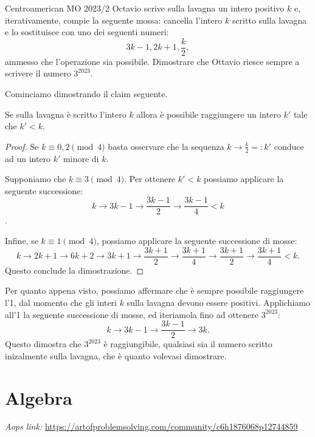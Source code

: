 \documentclass{article}
\begin{document}
\begin{proposition}{Centroamerican MO 2023/2}{}
	Octavio scrive sulla lavagna un intero positivo $k$ e, iterativamente,
	compie la seguente mossa: cancella l'intero $k$ scritto sulla lavagna
	e lo sostituisce con uno dei seguenti numeri:
	\[ 3k-1, 2k+1, \frac{k}{2}, \]
	ammesso che l'operazione sia possibile. Dimostrare che Ottavio riesce
	sempre a scrivere il numero $3^{2023}$.
\end{proposition}

Cominciamo dimostrando il claim seguente.

\begin{claim*}{}{}
	Se sulla lavagna è scritto l'intero $k$ allora è possibile
	raggiungere un intero $k'$ tale che $k'<k$.
\end{claim*}
\begin{proof}
	Se $k\equiv 0,2 \pmod{4}$ basta osservare che la sequenza
	$k\rightarrow \frac{k}{2}=:k'$ conduce ad un intero $k'$ minore di $k$.

	Supponiamo che $k\equiv 3\pmod{4}$. Per ottenere $k'<k$ possiamo
	applicare la seguente successione:
	\[ k\rightarrow 3k-1 \rightarrow \frac{3k-1}{2} \rightarrow \frac{3k-1}{4}<k \].

	Infine, se $k\equiv 1\pmod{4}$, possiamo applicare la seguente successione
	di mosse:
	\[ k\rightarrow 2k+1\rightarrow 6k+2\rightarrow 3k+1
	\rightarrow \frac{3k+1}{2} \rightarrow \frac{3k+1}{4}\rightarrow
	\frac{3k+1}{2} \rightarrow \frac{3k+1}{4}<k. \]
	Questo conclude la dimostrazione.
\end{proof}

Per quanto appena visto, possiamo affermare che è sempre possibile
raggiungere l'1, dal momento che gli interi $k$ sulla lavagna devono essere
positivi. Applichiamo all'1 la seguente successione di mosse, ed iteriamola
fino ad ottenere $3^{2023}$:
\[ k\rightarrow 3k-1\rightarrow \frac{3k-1}{2} \rightarrow {3k}. \]
Questo dimostra che $3^{2023}$ è raggiungibile, qualsiasi sia il numero
scritto inizalmente sulla lavagna, che è quanto volevasi dimostrare.

\newpage

\section{Algebra}

\textit{Aops link:}
\href{https://artofproblemsolving.com/community/c6h1876068p12744859}
{https://artofproblemsolving.com/community/c6h1876068p12744859}
\end{document}
